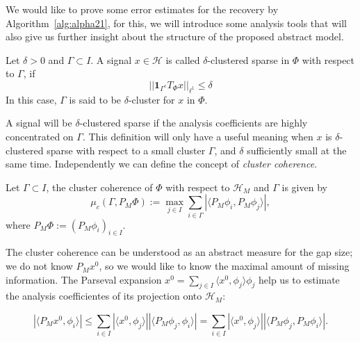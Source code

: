 \bigskip

We would like to prove some error estimates for the recovery by Algorithm~\ref{alg:alpha21}, for this, we will introduce some analysis tools that will also give us further insight about the structure of the proposed abstract model.

\bigskip

\begin{defn}
\label{def:alpha22}
Let $\delta>0$ and $\Gamma\subset I$. A signal $x\in\mathcal{H}$ is called $\delta$-clustered sparse in $\Phi$ with respect to $\Gamma$, if
\begin{equation}
\label{eq:alpha22}
||\mathbf{1}_{\Gamma^c}T_{\Phi}x||_{\ell^1}\leq \delta
\end{equation}
In this case, $\Gamma$ is said to be $\delta$-cluster for $x$ in $\Phi$. 
\end{defn}

\bigskip

A signal will be $\delta$-clustered sparse if the analysis coefficients are highly concentrated on $\Gamma$. This definition will only have a useful meaning when $x$ is $\delta$-clustered sparse with respect to a small cluster $\Gamma$, and $\delta$ sufficiently small at the same time. Independently we can define the concept of \textit{cluster coherence}.

\bigskip

\begin{defn}
Let $\Gamma\subset I$, the cluster coherence of $\Phi$ with respect to $\mathcal{H}_M$ and $\Gamma$ is given by 
$$
\mu_c(\Gamma,P_M\Phi):=\max_{j\in I}\sum_{i\in\Gamma}|\langle P_M\phi_i,P_M\phi_j\rangle|,
$$
where $P_M\Phi:=(P_M\phi_i)_{i\in I}$.
\end{defn}

\bigskip

The cluster coherence can be understood as an abstract measure for the gap size; we do not know $P_Mx^0$, so we would like to know the maximal amount of missing information. The Parseval expansion $x^0=\sum_{j\in I}\langle x^0,\phi_j\rangle \phi_j$ help us to estimate the analysis coefficientes of its projection onto $\mathcal{H}_M$:

\begin{equation}
\label{eq:alpha23}
|\langle P_Mx^0,\phi_i\rangle|\leq\sum_{i\in I}|\langle x^0,\phi_j\rangle||\langle P_M\phi_j,\phi_i\rangle|=\sum_{i\in I}|\langle x^0,\phi_j\rangle||\langle P_M\phi_j, P_M\phi_i\rangle|.
\end{equation}

